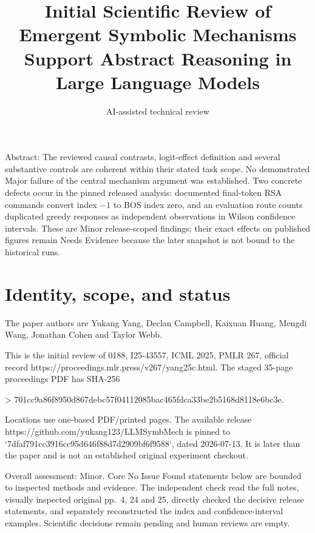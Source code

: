 \documentclass[10pt]{article}
\title{Initial Scientific Review of
Emergent Symbolic Mechanisms Support Abstract Reasoning in Large Language Models}
\author{AI-assisted technical review}
\date{}
\begin{document}
\maketitle
Abstract: The reviewed causal contrasts, logit-effect definition and several substantive controls are coherent within their stated task scope. No demonstrated Major failure of the central mechanism argument was established. Two concrete defects occur in the pinned released analysis: documented final-token RSA commands convert index \(-1\) to BOS index zero, and an evaluation route counts duplicated greedy responses as independent observations in Wilson confidence intervals. These are Minor release-scoped findings; their exact effects on published figures remain Needs Evidence because the later snapshot is not bound to the historical runs.\par
\section*{Identity, scope, and status}
The paper authors are Yukang Yang, Declan Campbell, Kaixuan Huang, Mengdi Wang, Jonathan Cohen and Taylor Webb.\par
This is the initial review of 0188, I25-43557, ICML 2025, PMLR 267, official record https://proceedings.mlr.press/v267/yang25c.html. The staged 35-page proceedings PDF has SHA-256\par
> 701cc9a86f8950d867debc57f04112085bac465fdca33be2b5168d8118e6bc3e.\par
Locations use one-based PDF/printed pages. The available release https://github.com/yukang123/LLMSymbMech is pinned to `7dfaf791cc3916cc95d646f88d7d2909bf6f9588`, dated 2026-07-13. It is later than the paper and is not an established original experiment checkout.\par
Overall assessment: Minor. Core No Issue Found statements below are bounded to inspected methods and evidence. The independent check read the full notes, visually inspected original pp. 4, 24 and 25, directly checked the decisive release statements, and separately reconstructed the index and confidence-interval examples. Scientific decisions remain pending and human reviews are empty.\par
\end{document}
